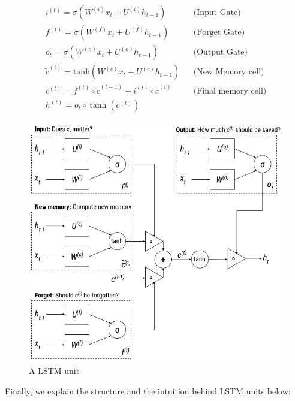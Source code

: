 \begin{equation}
\begin{aligned}
	i^{(t)} = \sigma(W^{(i)}x_t + U^{(i)}h_{t-1}) && \text{(Input \ Gate)} \\
	f^{(t)} = \sigma(W^{(f)}x_t + U^{(f)}h_{t-1}) && \text{(Forget \ Gate)} \\
	o_t = \sigma(W^{(o)}x_t + U^{(o)}h_{t-1}) && \text{(Output \ Gate)} \\
	\widetilde{c}^{(t)} = \text{tanh}(W^{(c)}x_t + U^{(c)}h_{t-1}) && \text{(New \ Memory \ cell)} \\
	c^{(t)} = f^{(t)} \circ \widetilde{c}^{(t-1)} + i^{(t)} \circ \widetilde{c}^{(t)} && \text{(Final \ memory \ cell)} \\
	h^{(t)} = o_t \circ \tanh(c^{(t)})
\end{aligned}
\end{equation}


\begin{figure}[!htb]
    \centering
    \includegraphics[scale=0.55]{Figures/lstm-unit.png}
    \caption{A LSTM unit}
    \label{fig:lstmunit}
\end{figure}

Finally, we explain the structure and the intuition behind LSTM units below:

